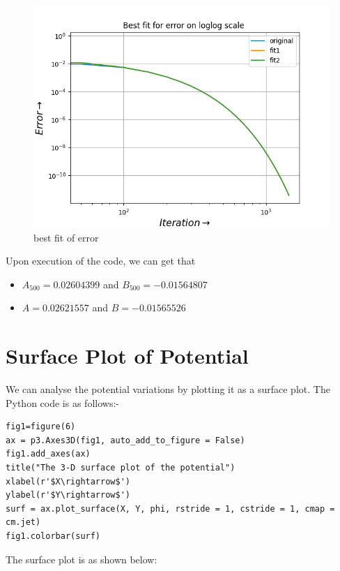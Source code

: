 \documentclass[11pt, a4paper]{article}
\begin{document}
\begin{figure}[!tbh]
 \centering
 \includegraphics[scale=0.7]{Ass5_Figure_6.png}  
 \caption{best fit of error}
\end{figure}

\newpage
Upon execution of the code, we can get that 
\begin{itemize}
\item
$ A_{500} = 0.02604399$ and $B_{500} = -0.01564807 $ 

\item
$A = 0.02621557$ and $B = -0.01565526$

\end{itemize}


\section{Surface Plot of Potential}

We can analyse the potential variations by plotting it as a surface plot. The Python code is as follows:-
 \begin{verbatim}
fig1=figure(6)
ax = p3.Axes3D(fig1, auto_add_to_figure = False) 
fig1.add_axes(ax)
title("The 3-D surface plot of the potential")
xlabel(r'$X\rightarrow$')
ylabel(r'$Y\rightarrow$')
surf = ax.plot_surface(X, Y, phi, rstride = 1, cstride = 1, cmap = cm.jet)
fig1.colorbar(surf)
  \end{verbatim}
    

\newpage
The surface plot is as shown below:
\end{document}

